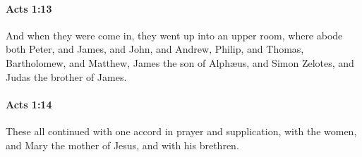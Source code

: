 		\paragraph{Acts 1:13} %
			\label{ACTS-1-13}

			And when they were come in, they went up into an upper room, where abode both Peter, and James, and John, and Andrew, Philip, and Thomas, Bartholomew, and Matthew, James the son of Alphæus, and Simon Zelotes, and Judas the  brother of James.

			\begin{framed}
			\scriptsize
				\begin{compactdesc}
					\item[SBLG] 
				\end{compactdesc}
			\end{framed}

		\paragraph{Acts 1:14} %
			\label{ACTS-1-14}

			These all continued with one accord in prayer and supplication, with the women, and Mary the mother of Jesus, and with his brethren.

